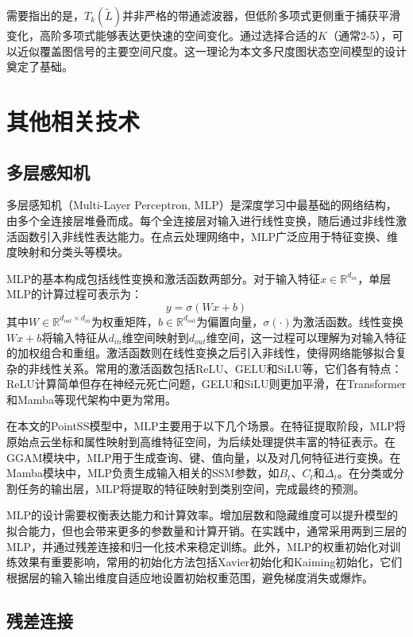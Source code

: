\documentclass[12pt,a4paper,openany,oneside]{ctexbook}
\theoremstyle{definition}
\theoremstyle{remark}
\begin{document}
需要指出的是，$T_k(\tilde{L})$并非严格的带通滤波器，但低阶多项式更侧重于捕获平滑变化，高阶多项式能够表达更快速的空间变化\cite{defferrard2016convolutional}。通过选择合适的$K$（通常2-5），可以近似覆盖图信号的主要空间尺度。这一理论为本文多尺度图状态空间模型的设计奠定了基础。

\section{其他相关技术}

\subsection{多层感知机}

多层感知机（Multi-Layer Perceptron, MLP）是深度学习中最基础的网络结构，由多个全连接层堆叠而成。每个全连接层对输入进行线性变换，随后通过非线性激活函数引入非线性表达能力。在点云处理网络中，MLP广泛应用于特征变换、维度映射和分类头等模块。

MLP的基本构成包括线性变换和激活函数两部分。对于输入特征$x \in \mathbb{R}^{d_{in}}$，单层MLP的计算过程可表示为：
\begin{equation}
y = \sigma(Wx + b)
\end{equation}
其中$W \in \mathbb{R}^{d_{out} \times d_{in}}$为权重矩阵，$b \in \mathbb{R}^{d_{out}}$为偏置向量，$\sigma(\cdot)$为激活函数。线性变换$Wx + b$将输入特征从$d_{in}$维空间映射到$d_{out}$维空间，这一过程可以理解为对输入特征的加权组合和重组。激活函数则在线性变换之后引入非线性，使得网络能够拟合复杂的非线性关系。常用的激活函数包括ReLU、GELU和SiLU等，它们各有特点：ReLU计算简单但存在神经元死亡问题，GELU和SiLU则更加平滑，在Transformer和Mamba等现代架构中更为常用。

在本文的PointSS模型中，MLP主要用于以下几个场景。在特征提取阶段，MLP将原始点云坐标和属性映射到高维特征空间，为后续处理提供丰富的特征表示。在GGAM模块中，MLP用于生成查询、键、值向量，以及对几何特征进行变换。在Mamba模块中，MLP负责生成输入相关的SSM参数，如$B_t$、$C_t$和$\Delta_t$。在分类或分割任务的输出层，MLP将提取的特征映射到类别空间，完成最终的预测。

MLP的设计需要权衡表达能力和计算效率。增加层数和隐藏维度可以提升模型的拟合能力，但也会带来更多的参数量和计算开销。在实践中，通常采用两到三层的MLP，并通过残差连接和归一化技术来稳定训练。此外，MLP的权重初始化对训练效果有重要影响，常用的初始化方法包括Xavier初始化和Kaiming初始化，它们根据层的输入输出维度自适应地设置初始权重范围，避免梯度消失或爆炸。

\subsection{残差连接}
\end{document}
